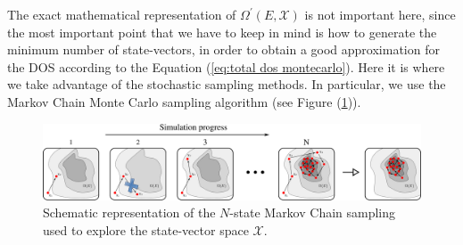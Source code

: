 \documentclass[a4paper,12pt]{article}
\begin{document}
The exact mathematical representation of $\Omega^\prime\left(E,\boldsymbol{\mathcal{X}}\right)$ is not important here, since the most
important point that we have to keep in mind is how to generate the minimum number of state-vectors, in order
to obtain a good approximation for the DOS according to the Equation (\ref{eq:total dos montecarlo}).
Here it is where we take advantage of the stochastic sampling methods. In particular, we use the
Markov Chain Monte Carlo sampling algorithm (see Figure (\ref{fig: schematic diagram of markov chain})).

\begin{figure}[h]
\centering
\includegraphics[scale=0.3]{images/stateVectorSearch.eps}
\caption{\footnotesize{
Schematic representation of the $N$-state Markov Chain sampling used to explore the state-vector space $\mathcal{X}$.
}}
\label{fig: schematic diagram of markov chain}
\end{figure}
\end{document}
